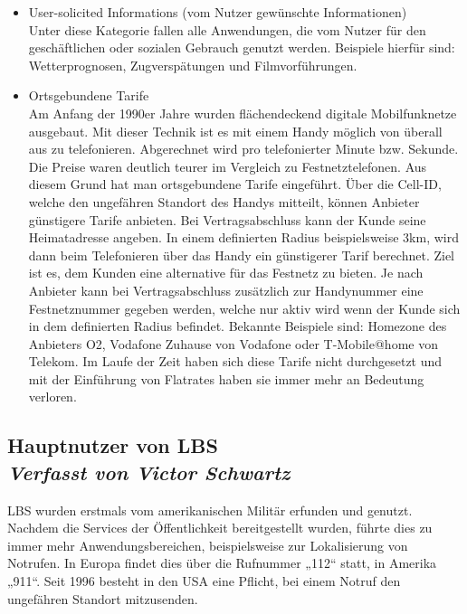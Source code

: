 \begin{itemize}
	\item User-solicited Informations (vom Nutzer gewünschte Informationen)\\
Unter diese Kategorie fallen alle Anwendungen, die vom Nutzer für den geschäftlichen oder sozialen Gebrauch genutzt werden. Beispiele hierfür sind: Wetterprognosen, Zugverspätungen und Filmvorführungen.
	\item Ortsgebundene Tarife\\
	Am Anfang der 1990er Jahre wurden flächendeckend digitale Mobilfunknetze ausgebaut. Mit dieser Technik ist es mit einem Handy möglich von überall aus zu telefonieren. Abgerechnet wird pro telefonierter Minute bzw. Sekunde. Die Preise waren deutlich teurer im Vergleich zu Festnetztelefonen. Aus diesem Grund hat man ortsgebundene Tarife eingeführt. Über die Cell-ID, welche den ungefähren Standort des Handys mitteilt, können Anbieter günstigere Tarife anbieten. Bei Vertragsabschluss kann der Kunde seine Heimatadresse angeben. In einem definierten Radius beispielsweise 3km, wird dann beim Telefonieren über das Handy ein günstigerer Tarif berechnet. Ziel ist es, dem Kunden eine alternative für das Festnetz zu bieten. Je nach Anbieter kann bei Vertragsabschluss zusätzlich zur Handynummer eine Festnetznummer gegeben werden, welche nur aktiv wird wenn der Kunde sich in dem definierten Radius befindet. Bekannte Beispiele sind: Homezone des Anbieters O2, Vodafone Zuhause von Vodafone oder T-Mobile@home von Telekom. Im Laufe der Zeit haben sich diese Tarife nicht durchgesetzt und mit der Einführung von Flatrates haben sie immer mehr an Bedeutung verloren. \cite{OrtgTarife} 
\end{itemize}

\newpage
\subsection[Hauptnutzer von LBS]{Hauptnutzer von LBS
 \\ \textnormal{\small{\textit {Verfasst von Victor Schwartz}}}}

LBS wurden erstmals vom amerikanischen Militär erfunden und genutzt. Nachdem die Services der Öffentlichkeit bereitgestellt wurden, führte dies zu immer mehr Anwendungsbereichen, beispielsweise zur Lokalisierung von Notrufen. In Europa findet dies über die Rufnummer „112“ statt, in Amerika „911“.  Seit 1996 besteht in den USA eine Pflicht, bei einem Notruf den ungefähren Standort mitzusenden. 

